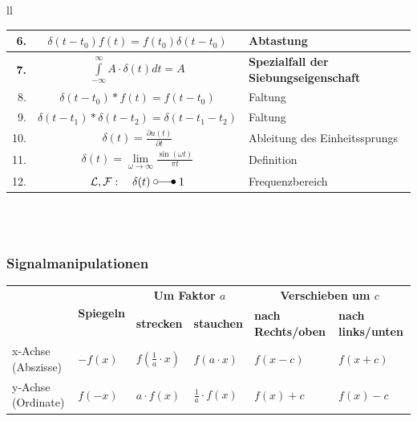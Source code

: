 \begin{tabular}{ll}
{\begin{tabular}{|r|c|l|}
	 		6. & $\delta(t-t_0)f(t) = f(t_0)\delta(t-t_0)$ &  Abtastung\index{Abtastung}\\ \hline
	 		\textbf{7.} & $\int\limits_{-\infty}^{\infty}A\cdot\delta(t)dt = A$ & \textbf{Spezialfall der Siebungseigenschaft} \\ \hline
	 		8. & $\delta(t-t_0)\ast f(t) = f(t-t_0)$ & Faltung\\ \hline
	 		9. & $\delta(t-t_1)\ast\delta(t-t_2) = \delta(t-t_1-t_2)$ & Faltung\index{Faltung}\\ \hline
			10. & $\delta(t)=\frac{\partial u(t)}{\partial t}$ & Ableitung des Einheitssprungs\index{Ableitung}\\ \hline
			11. & $\delta(t)=\lim\limits_{\omega\rightarrow \infty}\frac{\sin(\omega t)}{\pi t}$ & Definition\\ \hline 
			12. & $\mathcal{L}, \mathcal{F}:\quad \delta(t) \; \laplace \; 1$ 
			& Frequenzbereich
		\\ \hline
		\end{tabular}
		\\
		\vspace{.1cm}\\
		}
		\end{tabular}
	
	\subsubsection{Signalmanipulationen}
		\begin{tabularx}{\textwidth}{|l|X|X|X|X|X|}
			\hline
			{}
			&	\multirow{2}{*}{\textbf{Spiegeln}}
			&	\multicolumn{2}{c|}{\textbf{Um Faktor $a$}}
			&	\multicolumn{2}{c|}{\textbf{Verschieben um $c$}}
			\\ 
			{}
			&	
			&	\textbf{strecken}
			&	\textbf{stauchen}
			&	\textbf{nach Rechts/oben}
			&	\textbf{nach links/unten}
			\\ \hline 
				x-Achse (Abszisse)
			&	$-f(x)$
			&	$f(\frac{1}{a} \cdot x)$
			&	$f(a \cdot x)$
			&	$f(x - c)$
			&	$f(x + c)$
			\\ \hline 
				y-Achse (Ordinate)
			&	$f(-x)$
			&	$a \cdot f(x)$
			&	$\frac{1}{a} \cdot f(x)$
			&	$f(x) + c$
			&	$f(x) - c$	
			\\ \hline 
			
		\end{tabularx}
	
		